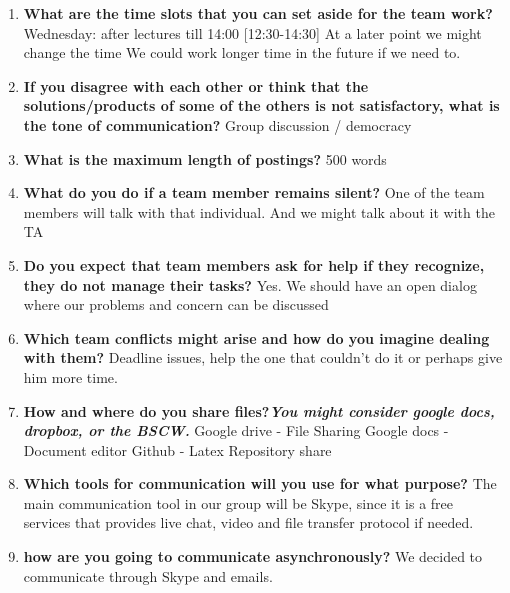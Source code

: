 \begin{enumerate}
	\item \textbf{What are the time slots that you can set aside for the team work?}
	Wednesday: after lectures till 14:00 [12:30-14:30]
	At a later point we might change the time
	We could work longer time in the future if we need to.
	
	\item \textbf{ If you disagree with each other or think that the solutions/products of some of the others is not satisfactory, what is the tone of communication?}
	Group discussion / democracy
	
	\item \textbf{What is the maximum length of postings?}
	500 words
	\item \textbf{What do you do if a team member remains silent?}
	One of the team members will talk with that individual. And we might talk about it with the TA
	
	\item \textbf{Do you expect that team members ask for help if they recognize, they do not manage their tasks?}
	Yes. We should have an open dialog where our problems and concern can be discussed
	\item \textbf{Which team conflicts might arise and how do you imagine dealing with them?}
	Deadline issues, help the one that couldn’t do it or perhaps give him more time.
	
	\item \textbf{How and where do you share files?\textit{You might consider google docs, dropbox, or the BSCW.}}
	Google drive - File Sharing
	Google docs - Document editor
	Github - Latex Repository share
	
	\item \textbf{Which tools for communication will you use for what purpose?}
	The main communication tool in our group will be Skype, since it is a free services that provides
live chat, video and file transfer protocol if needed.
	
	\item \textbf{how are you going to communicate asynchronously?}
	We decided to communicate through Skype and emails.
\end{enumerate}